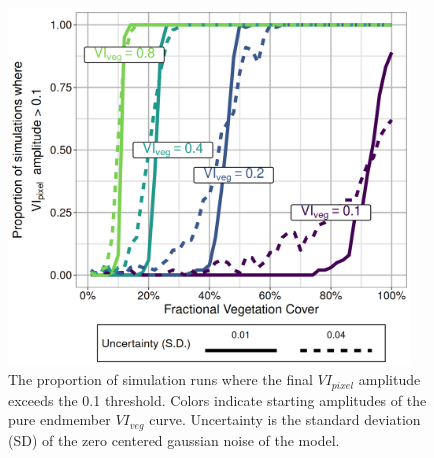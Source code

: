 \documentclass{article}
\begin{document}
\begin{figure}[h]
    \centering
    \includegraphics[width=0.95\textwidth]{figures/fig2_sim_detectability.png}
    \caption{The proportion of simulation runs where the final $VI_{pixel}$ amplitude exceeds the 0.1 threshold. Colors indicate starting amplitudes of the pure endmember $VI_{veg}$ curve. Uncertainty is the standard deviation (SD) of the zero centered gaussian noise of the model.}
    \label{fig2}
\end{figure}
\end{document}
